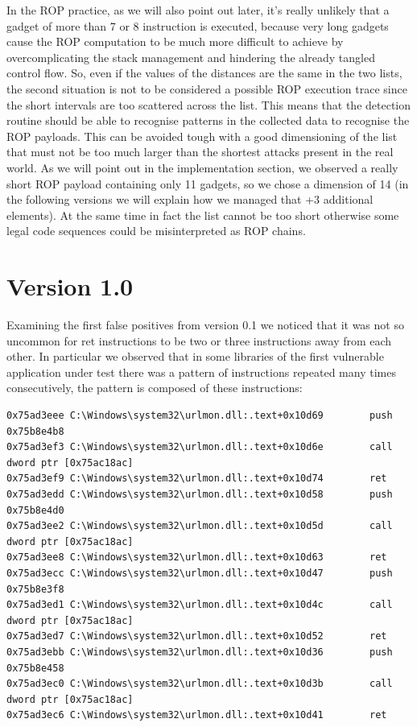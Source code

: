 \documentclass[Lau,binding=0.6cm]{sapthesis}
\begin{document}
In the ROP practice, as we will also point out later, it’s really unlikely that a gadget of more than 7 or 8 instruction is executed, because very long gadgets cause the ROP computation to be much more difficult to achieve by overcomplicating the stack management and hindering the already tangled control flow.
So, even if the values of the distances are the same in the two lists, the second situation is not to be considered a possible ROP execution trace since the short intervals are too scattered across the list. This means that the detection routine should be able to recognise patterns in the collected data to recognise the ROP payloads. This can be avoided tough with a good dimensioning of the list that must not be too much larger than the shortest attacks present in the real world. As we will point out in the implementation section, we observed a really short ROP payload containing only 11 gadgets, so we chose a dimension of 14 (in the following versions we will explain how we managed that +3 additional elements). At the same time in fact the list cannot be too short otherwise some legal code sequences could be misinterpreted as ROP chains.

\section{Version 1.0}

Examining the first false positives from version 0.1 we noticed that it was not so uncommon for ret instructions to be two or three instructions away from each other. In particular we observed that in some libraries of the first vulnerable application under test there was a pattern of instructions repeated many times consecutively, the pattern is composed of these instructions:

\begingroup
    \fontsize{8pt}{9pt}\selectfont
\begin{verbatim}
0x75ad3eee C:\Windows\system32\urlmon.dll:.text+0x10d69        push 0x75b8e4b8
0x75ad3ef3 C:\Windows\system32\urlmon.dll:.text+0x10d6e        call dword ptr [0x75ac18ac]
0x75ad3ef9 C:\Windows\system32\urlmon.dll:.text+0x10d74        ret 
0x75ad3edd C:\Windows\system32\urlmon.dll:.text+0x10d58        push 0x75b8e4d0
0x75ad3ee2 C:\Windows\system32\urlmon.dll:.text+0x10d5d        call dword ptr [0x75ac18ac]
0x75ad3ee8 C:\Windows\system32\urlmon.dll:.text+0x10d63        ret 
0x75ad3ecc C:\Windows\system32\urlmon.dll:.text+0x10d47        push 0x75b8e3f8
0x75ad3ed1 C:\Windows\system32\urlmon.dll:.text+0x10d4c        call dword ptr [0x75ac18ac]
0x75ad3ed7 C:\Windows\system32\urlmon.dll:.text+0x10d52        ret 
0x75ad3ebb C:\Windows\system32\urlmon.dll:.text+0x10d36        push 0x75b8e458
0x75ad3ec0 C:\Windows\system32\urlmon.dll:.text+0x10d3b        call dword ptr [0x75ac18ac]
0x75ad3ec6 C:\Windows\system32\urlmon.dll:.text+0x10d41        ret 
\end{verbatim}
\endgroup
\end{document}
